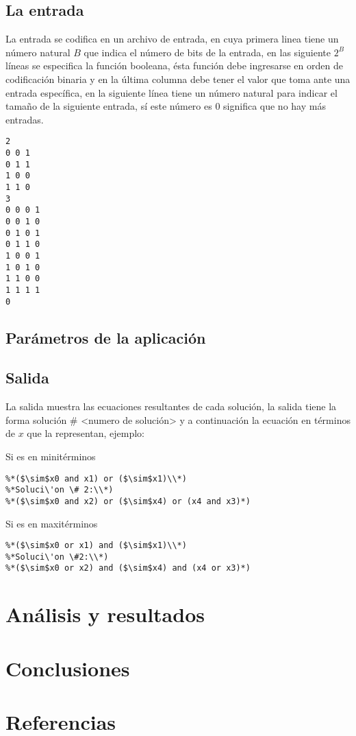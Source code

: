\documentclass[a4paper]{article}
\begin{document}
\subsection{La entrada}

La entrada se codifica en un archivo de entrada, en cuya primera linea tiene un número natural $B$ que indica el número de bits de la entrada, en las siguiente $2^B$ líneas se especifica la función booleana, ésta función debe ingresarse en orden de codificación binaria y en la última columna debe tener el valor que toma ante una entrada específica, en la siguiente línea tiene un número natural para indicar el tamaño de la siguiente entrada, sí este número es $0$ significa que no hay más entradas.

\lstset{frameround=fttt}
\begin{lstlisting}[frame=trBL]
2
0 0 1
0 1 1
1 0 0
1 1 0
3
0 0 0 1
0 0 1 0 
0 1 0 1
0 1 1 0
1 0 0 1
1 0 1 0
1 1 0 0
1 1 1 1
0
\end{lstlisting}

\subsection{Parámetros de la aplicación}

\subsection{Salida}

La salida muestra las ecuaciones resultantes de cada solución, la salida tiene la forma solución \# <numero de solución> y a continuación la ecuación en términos de $x$ que la representan, ejemplo:

Si es en minitérminos
\lstset{frameround=fttt}
\begin{lstlisting}[frame=trBL]
%*Soluci\'on \# 1:\\*)
%*($\sim$x0 and x1) or ($\sim$x1)\\*)
%*Soluci\'on \# 2:\\*)
%*($\sim$x0 and x2) or ($\sim$x4) or (x4 and x3)*)
\end{lstlisting}

Si es en maxitérminos
\lstset{frameround=fttt}
\begin{lstlisting}[frame=trBL]
%*Soluci\'{o}n \#1:\\*)
%*($\sim$x0 or x1) and ($\sim$x1)\\*)
%*Soluci\'on \#2:\\*)
%*($\sim$x0 or x2) and ($\sim$x4) and (x4 or x3)*)
\end{lstlisting}

\section{Análisis y resultados}

\section{Conclusiones}

\section{Referencias}
\end{document}
